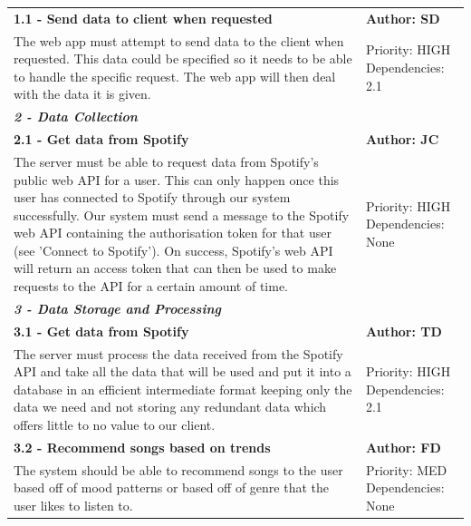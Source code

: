 \documentclass[11pt]{report}
\begin{document}
\begin{center}

\begin{longtable}{| p{13cm} | p{3cm} |}
\endfirsthead
\endlastfoot

\multicolumn{2}{c}{\textit{Continued from last page}}
\endhead

\multicolumn{2}{c}{\textit{Continued on next page}}
\endfoot

\hline
\multicolumn{2}{|l|}{\textbf{\textit{1 - Server}}} \\
\hline
\textbf{1.1 - Send data to client when requested} & \textbf{Author: SD} \\
\hline
The web app must attempt to send data to the client when requested. This data could be specified so it needs to be able to handle the specific request. The web app will then deal with the data it is given. & Priority: HIGH Dependencies: 2.1 \\
\hline
\multicolumn{2}{|l|}{\textbf{\textit{2 - Data Collection}}} \\
\hline
\textbf{2.1 - Get data from Spotify} & \textbf{Author: JC} \\
\hline
The server must be able to request data from Spotify’s public web API for a user. This can only happen once this user has connected to Spotify through our system successfully. Our system must send a message to the Spotify web API containing the authorisation token for that user (see 'Connect to Spotify'). On success, Spotify's web API will return an access token that can then be used to make requests to the API for a certain amount of time. & Priority: HIGH Dependencies: None \\
\hline
\multicolumn{2}{|l|}{\textbf{\textit{3 - Data Storage and Processing}}} \\
\hline
\textbf{3.1 - Get data from Spotify} & \textbf{Author: TD} \\
\hline
The server must process the data received from the Spotify API and take all the data that will be used and put it into a database in an efficient intermediate format keeping only the data we need and not storing any redundant data which offers little to no value to our client. & Priority: HIGH Dependencies: 2.1 \\
\hline
\textbf{3.2 - Recommend songs based on trends} & \textbf{Author: FD} \\
\hline
The system should be able to recommend songs to the user based off of mood patterns or based off of genre that the user likes to listen to. & Priority: MED Dependencies: None \\

\end{longtable}
\end{center}
\end{document}
